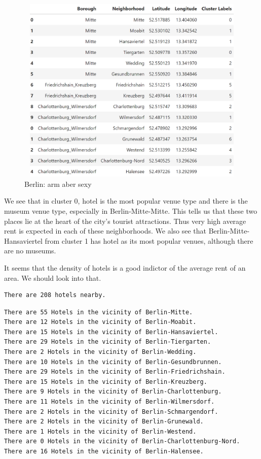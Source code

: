 \documentclass[11pt]{article}
\begin{document}
                 \begin{figure}
\centering
\includegraphics[width=17cm, height=9cm]{"Screenshot (33).png"}
\caption{Berlin: arm aber sexy}
\end{figure}

        
    We see that in cluster 0, hotel is the most popular venue type and there
is the museum venue type, especially in Berlin-Mitte-Mitte. This tells
us that these two places lie at the heart of the city's tourist
attractions. Thus very high average rent is expected in each of these
neighborhoods. We also see that Berlin-Mitte-Hansaviertel from cluster 1
has hotel as its most popular venues, although there are no museums.

It seems that the density of hotels is a good indictor of the average
rent of an area. We should look into that.

    

    \begin{Verbatim}[commandchars=\\\{\}]
There are 208 hotels nearby.
    \end{Verbatim}

   

    \begin{Verbatim}[commandchars=\\\{\}]
There are 55 Hotels in the vicinity of Berlin-Mitte.
There are 12 Hotels in the vicinity of Berlin-Moabit.
There are 15 Hotels in the vicinity of Berlin-Hansaviertel.
There are 29 Hotels in the vicinity of Berlin-Tiergarten.
There are 2 Hotels in the vicinity of Berlin-Wedding.
There are 10 Hotels in the vicinity of Berlin-Gesundbrunnen.
There are 29 Hotels in the vicinity of Berlin-Friedrichshain.
There are 15 Hotels in the vicinity of Berlin-Kreuzberg.
There are 9 Hotels in the vicinity of Berlin-Charlottenburg.
There are 11 Hotels in the vicinity of Berlin-Wilmersdorf.
There are 2 Hotels in the vicinity of Berlin-Schmargendorf.
There are 2 Hotels in the vicinity of Berlin-Grunewald.
There are 1 Hotels in the vicinity of Berlin-Westend.
There are 0 Hotels in the vicinity of Berlin-Charlottenburg-Nord.
There are 16 Hotels in the vicinity of Berlin-Halensee.
    \end{Verbatim}
\end{document}
